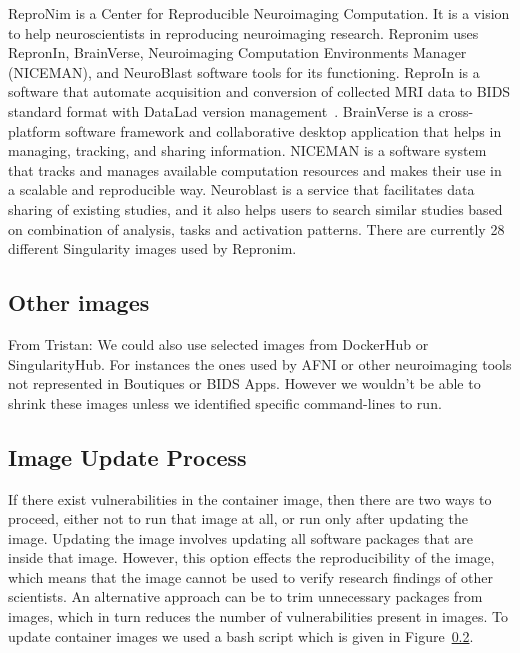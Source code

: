 \documentclass[a4paper,num-refs]{oup-contemporary}
\newcommand{\TG}[1]{\color{blue}From Tristan: #1\color{black}}
\begin{document}
ReproNim is a Center for Reproducible Neuroimaging Computation. It is a vision
to help neuroscientists in reproducing neuroimaging research. Repronim
uses RepronIn, BrainVerse, Neuroimaging Computation Environments Manager (NICEMAN),
and NeuroBlast software tools for its
functioning. ReproIn is a software that automate acquisition and conversion
of collected MRI data to BIDS standard format with DataLad version management~\cite{kennedy2019everything}.
BrainVerse is a cross-platform software framework and collaborative desktop application
that helps in managing, tracking, and sharing information.
NICEMAN is a software system that tracks and manages available computation resources
and makes their use in a scalable and reproducible way.
Neuroblast is a service that facilitates data sharing of existing studies, and it also
helps users to search similar studies based on combination of analysis,
tasks and activation patterns. There are currently 28 different Singularity
images used by Repronim. 

\subsection{Other images}

\TG{We could also use selected images from DockerHub or SingularityHub. For
instances the ones used by AFNI or other neuroimaging tools not represented
in Boutiques or BIDS Apps. However we wouldn't be able to shrink these
images unless we identified specific command-lines to run.}

\subsection{Image Update Process}

If there exist vulnerabilities in the container image, then there are two ways
to proceed, either not to run that image at all, or run only after updating the
image. Updating the image involves updating all software packages that are
inside that image. However, this option effects the reproducibility
of the image, which means that the image cannot be used to verify research
findings of other scientists. An alternative approach can be to trim unnecessary
packages from images, which in turn reduces the number of vulnerabilities
present in images. To update container images we used a bash script
which is given in Figure~\ref{}.
\end{document}
